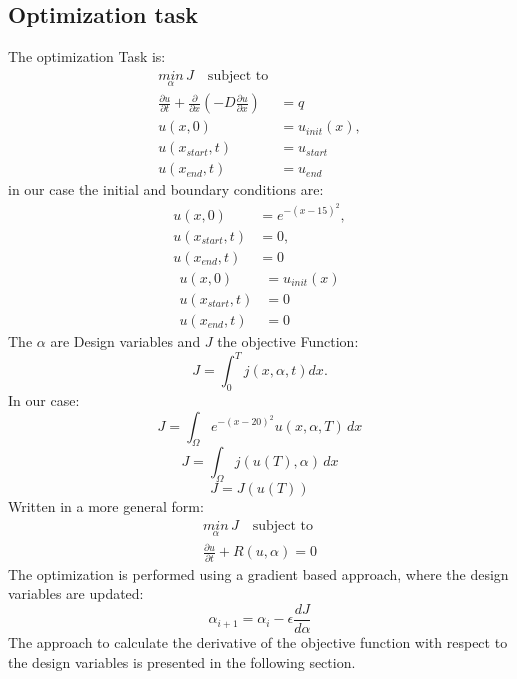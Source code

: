 \documentclass[10pt]{article}
\begin{document}
\subsection{Optimization task}
The optimization Task is:
\begin{align}
\underset{\alpha}{min}\,J\quad \text{subject to}\\
\frac{\partial u}{\partial t} +\frac{\partial}{\partial x} \left(- D \frac{\partial u}{\partial x}  \right) &= q \\
u(x,0) &= u_{init}(x), \\
u(x_{start},t)&= u_{start} \\
u(x_{end},t) &= u_{end}
\end{align}
in our case the initial and boundary conditions are:
\begin{align}
u(x,0) &= e^{-\left( x-15 \right)^2}, \\
u(x_{start},t)&= 0, \\
u(x_{end},t) &= 0
\end{align}
\begin{align}
u(x,0) &= u_{init}(x) \\
u(x_{start},t)&= 0 \\
u(x_{end},t) &= 0
\end{align}
The $\alpha$ are Design variables and $J$ the objective Function:
\begin{equation}
J = \int_{0}^{T} j(x, \alpha, t) dx.
\end{equation}
In our case:
\begin{equation}
J = \int_{\Omega} e^{-\left( x-20 \right)^2}u(x, \alpha, T) \,dx
\end{equation}
\begin{equation}
J = \int_{\Omega} j\left( u(T), \alpha \right) \,dx
\end{equation}
\begin{equation}
J =J\left( u(T) \right) 
\end{equation}
Written in a more general form:
\begin{align}
\underset{\alpha}{min}\,J\quad \text{subject to}\\
\frac{\partial u}{\partial t} + R\left(u, \alpha \right) = 0
\end{align}
The optimization is performed using a gradient based approach, where the design variables are updated:
\begin{equation}
\alpha_{i+1} = \alpha_i - \epsilon \frac{d J}{d \alpha}
\end{equation}
The approach to calculate the derivative of the objective function with respect to the design variables is presented in the following section.
\end{document}
